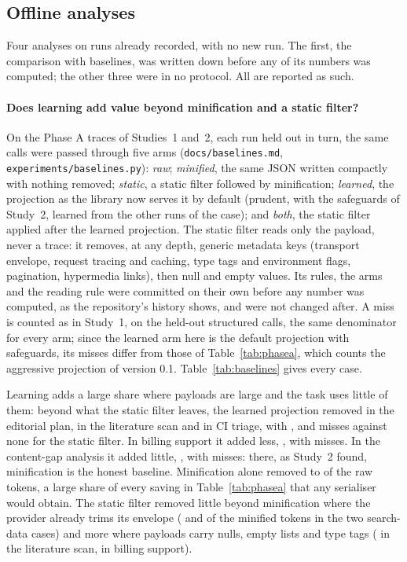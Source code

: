 \subsection{Offline analyses}
\label{sec:s3offline}

Four analyses on runs already recorded, with no new run. The first, the comparison with baselines, was written
down before any of its numbers was computed; the other three were in no protocol. All are reported as such.

\paragraph{Does learning add value beyond minification and a static filter?} On the Phase A traces of Studies~1
and~2, each run held out in turn, the same calls were passed through five arms (\texttt{docs/baselines.md},
\texttt{experiments/baselines.py}): \emph{raw}; \emph{minified}, the same JSON written compactly with nothing
removed; \emph{static}, a static filter followed by minification; \emph{learned}, the projection as the library
now serves it by default (prudent, with the safeguards of Study~2, learned from the other runs of the case); and
\emph{both}, the static filter applied after the learned projection. The static filter reads only the payload, never
a trace: it removes, at any depth, \BaseStaticKeys{} generic metadata keys (transport envelope, request tracing and
caching, type tags and environment flags, pagination, hypermedia links), then null and empty values. Its rules, the
arms and the reading rule were committed on their own before any number was computed, as the repository's history
shows, and were not changed after. A miss is counted as in Study~1, on the held-out structured calls, the same
denominator for every arm; since the learned arm here is the default projection with safeguards, its misses differ
from those of Table~\ref{tab:phasea}, which counts the aggressive projection of version 0.1.
Table~\ref{tab:baselines} gives every case.

Learning adds a large share where payloads are large and the task uses little of them: beyond what the static filter
leaves, the learned projection removed \BaseLearnedStatici{} in the editorial plan, \BaseLearnedStaticiii{} in the
literature scan and \BaseLearnedStaticv{} in CI triage, with \BaseMissLearnedi, \BaseMissLearnediii{} and
\BaseMissLearnedv{} misses against none for the static filter. In billing support it added less,
\BaseLearnedStaticiv, with \BaseMissLearnediv{} misses. In the content-gap analysis it added little,
\BaseLearnedStaticii, with \BaseMissLearnedii{} misses: there, as Study~2 found, minification is the honest baseline.
Minification alone removed \BaseMinRawMin{} to \BaseMinRawMax{} of the raw tokens, a large share of every saving in
Table~\ref{tab:phasea} that any serialiser would obtain. The static filter removed little beyond minification where
the provider already trims its envelope (\BaseStaticMini{} and \BaseStaticMinii{} of the minified tokens in the
two search-data cases) and more where payloads carry nulls, empty lists and type tags (\BaseStaticMiniii{} in the
literature scan, \BaseStaticMiniv{} in billing support).

